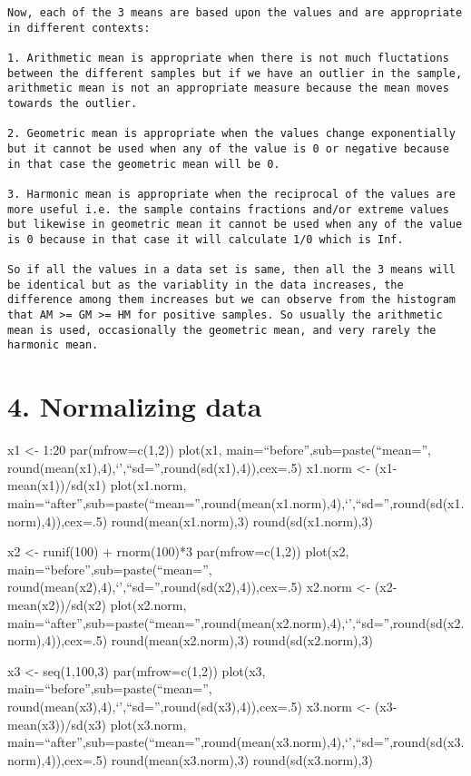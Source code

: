 \documentclass[]{article}
\begin{document}
\begin{verbatim}
Now, each of the 3 means are based upon the values and are appropriate in different contexts:

1. Arithmetic mean is appropriate when there is not much fluctations between the different samples but if we have an outlier in the sample, arithmetic mean is not an appropriate measure because the mean moves towards the outlier.

2. Geometric mean is appropriate when the values change exponentially but it cannot be used when any of the value is 0 or negative because in that case the geometric mean will be 0.

3. Harmonic mean is appropriate when the reciprocal of the values are more useful i.e. the sample contains fractions and/or extreme values but likewise in geometric mean it cannot be used when any of the value is 0 because in that case it will calculate 1/0 which is Inf.

So if all the values in a data set is same, then all the 3 means will be identical but as the variablity in the data increases, the difference among them increases but we can observe from the histogram that AM >= GM >= HM for positive samples. So usually the arithmetic mean is used, occasionally the geometric mean, and very rarely the harmonic mean.
\end{verbatim}

\section{4. Normalizing data}\label{normalizing-data}

x1 \textless{}- 1:20 par(mfrow=c(1,2)) plot(x1,
main=``before'',sub=paste(``mean='',
round(mean(x1),4),`\textbar{}',``sd='',round(sd(x1),4)),cex=.5) x1.norm
\textless{}- (x1-mean(x1))/sd(x1) plot(x1.norm,
main=``after'',sub=paste(``mean='',round(mean(x1.norm),4),`\textbar{}',``sd='',round(sd(x1.norm),4)),cex=.5)
round(mean(x1.norm),3) round(sd(x1.norm),3)

x2 \textless{}- runif(100) + rnorm(100)*3 par(mfrow=c(1,2)) plot(x2,
main=``before'',sub=paste(``mean='',
round(mean(x2),4),`\textbar{}',``sd='',round(sd(x2),4)),cex=.5) x2.norm
\textless{}- (x2-mean(x2))/sd(x2) plot(x2.norm,
main=``after'',sub=paste(``mean='',round(mean(x2.norm),4),`\textbar{}',``sd='',round(sd(x2.norm),4)),cex=.5)
round(mean(x2.norm),3) round(sd(x2.norm),3)

x3 \textless{}- seq(1,100,3) par(mfrow=c(1,2)) plot(x3,
main=``before'',sub=paste(``mean='',
round(mean(x3),4),`\textbar{}',``sd='',round(sd(x3),4)),cex=.5) x3.norm
\textless{}- (x3-mean(x3))/sd(x3) plot(x3.norm,
main=``after'',sub=paste(``mean='',round(mean(x3.norm),4),`\textbar{}',``sd='',round(sd(x3.norm),4)),cex=.5)
round(mean(x3.norm),3) round(sd(x3.norm),3)
\end{document}

